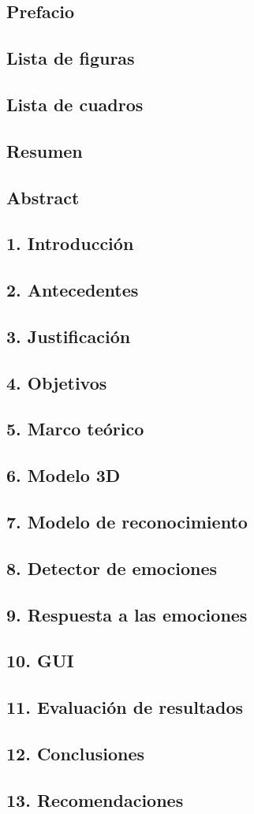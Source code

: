 \subsection*{Prefacio}
\subsection*{Lista de figuras}
\subsection*{Lista de cuadros}
\subsection*{Resumen}
\subsection*{Abstract}
\subsection*{1. Introducción}
\subsection*{2. Antecedentes}
\subsection*{3. Justificación}
\subsection*{4. Objetivos}
\subsection*{5. Marco teórico}
\subsection*{6. Modelo 3D}
\subsection*{7. Modelo de reconocimiento}
\subsection*{8. Detector de emociones}
\subsection*{9. Respuesta a las emociones}
\subsection*{10. GUI}
\subsection*{11. Evaluación de resultados}
\subsection*{12. Conclusiones}
\subsection*{13. Recomendaciones}